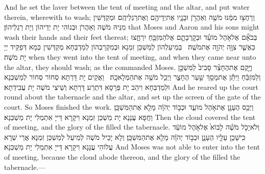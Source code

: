 {And he set the laver between the tent of meeting and the altar, and put water therein, wherewith to wash;}{}
{וְרָחֲצ֣וּ מִמֶּ֔נּוּ מֹשֶׁ֖ה וְאַהֲרֹ֣ן וּבָנָ֑יו אֶת\maqqaf יְדֵיהֶ֖ם וְאֶת\maqqaf רַגְלֵיהֶֽם׃}
{וּמְקַדְּשִׁין מִנֵּיהּ מֹשֶׁה וְאַהֲרֹן וּבְנוֹהִי יָת יְדֵיהוֹן וְיָת רַגְלֵיהוֹן׃}
{that Moses and Aaron and his sons might wash their hands and their feet thereat;}{}
{בְּבֹאָ֞ם אֶל\maqqaf אֹ֣הֶל מוֹעֵ֗ד וּבְקׇרְבָתָ֛ם אֶל\maqqaf הַמִּזְבֵּ֖חַ יִרְחָ֑צוּ כַּאֲשֶׁ֛ר צִוָּ֥ה יְהֹוָ֖ה אֶת\maqqaf מֹשֶֽׁה׃ \setuma }
{בְּמֵיעַלְהוֹן לְמַשְׁכַּן זִמְנָא וּבְמִקְרַבְהוֹן לְמַדְבְּחָא מְקַדְּשִׁין כְּמָא דְּפַקֵּיד יְיָ יָת מֹשֶׁה׃}
{when they went into the tent of meeting, and when they came near unto the altar, they should wash; as the \lord\space commanded Moses.}{}
{וַיָּ֣קֶם אֶת\maqqaf הֶחָצֵ֗ר סָבִיב֙ לַמִּשְׁכָּ֣ן וְלַמִּזְבֵּ֔חַ וַיִּתֵּ֕ן אֶת\maqqaf מָסַ֖ךְ שַׁ֣עַר הֶחָצֵ֑ר וַיְכַ֥ל מֹשֶׁ֖ה אֶת\maqqaf הַמְּלָאכָֽה׃ \petucha }
{וַאֲקֵים יָת דָּרְתָא סְחוֹר סְחוֹר לְמַשְׁכְּנָא וּלְמַדְבְּחָא וִיהַב יָת פְּרָסָא דִּתְרַע דָּרְתָא וְשֵׁיצִי מֹשֶׁה יָת עֲבִידְתָא׃}
{And he reared up the court round about the tabernacle and the altar, and set up the screen of the gate of the court. So Moses finished the work.}{}
{וַיְכַ֥ס הֶעָנָ֖ן אֶת\maqqaf אֹ֣הֶל מוֹעֵ֑ד וּכְב֣וֹד יְהֹוָ֔ה מָלֵ֖א אֶת\maqqaf הַמִּשְׁכָּֽן׃}
{וַחֲפָא עֲנָנָא יָת מַשְׁכַּן זִמְנָא וִיקָרָא דַּייָ אִתְמְלִי יָת מַשְׁכְּנָא׃}
{Then the cloud covered the tent of meeting, and the glory of the \lord\space filled the tabernacle.}{}
{וְלֹא\maqqaf יָכֹ֣ל מֹשֶׁ֗ה לָבוֹא֙ אֶל\maqqaf אֹ֣הֶל מוֹעֵ֔ד כִּֽי\maqqaf שָׁכַ֥ן עָלָ֖יו הֶעָנָ֑ן וּכְב֣וֹד יְהֹוָ֔ה מָלֵ֖א אֶת\maqqaf הַמִּשְׁכָּֽן׃}
{וְלָא יָכֵיל מֹשֶׁה לְמֵיעַל לְמַשְׁכַּן זִמְנָא אֲרֵי שְׁרָא עֲלוֹהִי עֲנָנָא וִיקָרָא דַּייָ אִתְמְלִי יָת מַשְׁכְּנָא׃}
{And Moses was not able to enter into the tent of meeting, because the cloud abode thereon, and the glory of the \lord\space filled the tabernacle.—}{}
